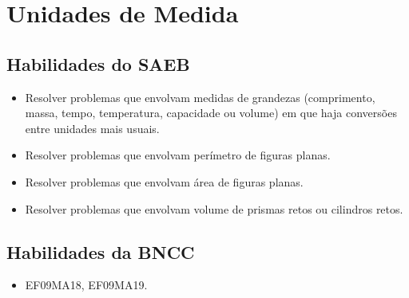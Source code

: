 \chapter{Unidades de Medida}

\section*{Habilidades do SAEB}

\begin{itemize}

  \item Resolver problemas que envolvam medidas de grandezas (comprimento,
massa, tempo, temperatura, capacidade ou volume) em que haja
conversões entre unidades mais usuais. 
  \item Resolver problemas que envolvam perímetro de figuras planas. 
  \item Resolver problemas que envolvam área de figuras planas. 
  \item Resolver problemas que envolvam volume de prismas retos ou cilindros
retos.  

\end{itemize} 

\section*{Habilidades da BNCC}

\begin{itemize}
  \item EF09MA18, EF09MA19. 
\end{itemize}

